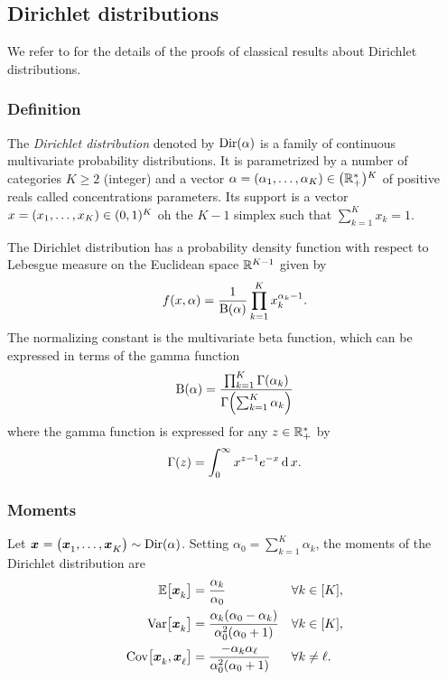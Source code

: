 \subsection{Dirichlet distributions}

We refer to \cite[Chapter 49]{Kotz2000} for the details of the proofs of classical results about Dirichlet distributions.


\subsubsection{Definition}


The \emph{Dirichlet distribution} denoted by $\operatorname{Dir}(\alpha)$ is a family of continuous multivariate probability distributions.
It is parametrized by a number of categories $K \ge 2$ (integer) and a vector $\alpha=\bracket{\alpha_1,\ldots,\alpha_K}\in\bracket{\RR_+^*}^K$ of positive reals called concentrations parameters.
Its support is a vector $x=\bracket{x_1,\ldots,x_K}\in\bracket{0,1}^K$ oh the $K-1$ simplex \ie such that $\sum_{k=1}^K x_k = 1$.

The Dirichlet distribution has a probability density function with respect to Lebesgue measure on the Euclidean space $\mathbb{R}^{K-1}$ given by
\begin{equation}\label{eq:dirchlet:probability-density-function}
  f\bracket{x,\alpha} = \frac{1}{ \Beta\bracket{\alpha}}\prod_{k=1}^K x_k^{\alpha_k-1}.
\end{equation}
The normalizing constant is the multivariate beta function, which can be expressed in terms of the gamma function
\begin{equation}
  \Beta\bracket{\alpha} =
  \frac{ \prod_{k=1}^K \Gamma\bracket{\alpha_k} }
       { \Gamma\bracket{\sum_{k=1}^K \alpha_k} }
\end{equation}
where the gamma function is expressed for any $z\in\mathbb{R}_+^*$ by
\begin{equation}
  \Gamma\bracket{z} = \int_0^{\infty} x^{z-1}e^{-x} \diff x.
\end{equation}


\subsubsection{Moments}


Let $\va x=\bracket{\va x_1,\ldots,\va x_K}\sim \Dir\bracket{\alpha}$.
Setting $\alpha_0=\sum_{k=1}^K\alpha_k$, the moments of the Dirichlet distribution are
\begin{subequations}\label{eq:dirchlet:moments}
  \begin{align}
    \espe\sqbracket{\va x_k} &= \frac{\alpha_k}{\alpha_0} && \forall k\in\range{K},
    \label{eq:dirchlet:moments:mean}
    \\
    \vari\sqbracket{\va x_k} &= \frac{\alpha_k\bracket{\alpha_0-\alpha_k}}{\alpha_0^2\bracket{\alpha_0+1}} && \forall k\in\range{K},
    \label{eq:dirchlet:moments:variance}
    \\
    \cova\sqbracket{\va x_k,\va x_{\ell}} &= \frac{-\alpha_k\alpha_{\ell}}{\alpha_0^2\bracket{\alpha_0+1}} && \forall k\ne\ell.
    \label{eq:dirchlet:moments:covariance}
  \end{align}
\end{subequations}


